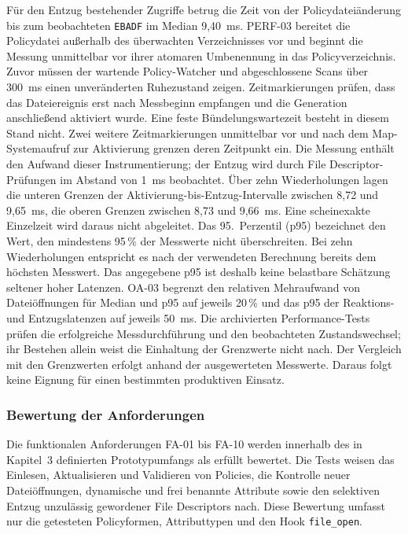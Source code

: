 Für den Entzug bestehender Zugriffe betrug die Zeit von der Policydateiänderung bis zum
beobachteten \texttt{EBADF} im Median 9,40~ms. PERF-03 bereitet die Policydatei außerhalb
des überwachten Verzeichnisses vor und beginnt die Messung unmittelbar vor ihrer atomaren
Umbenennung in das Policyverzeichnis. Zuvor müssen der wartende Policy-Watcher und abgeschlossene
Scans über 300~ms einen unveränderten Ruhezustand zeigen. Zeitmarkierungen prüfen, dass das
Dateiereignis erst nach Messbeginn empfangen und die Generation anschließend aktiviert wurde.
Eine feste Bündelungswartezeit besteht in diesem Stand nicht. Zwei weitere Zeitmarkierungen unmittelbar vor und nach dem Map-Systemaufruf
zur Aktivierung grenzen deren Zeitpunkt ein. Die Messung enthält den Aufwand dieser
Instrumentierung; der Entzug wird durch File Descriptor-Prüfungen im Abstand von 1~ms beobachtet.
Über zehn Wiederholungen lagen die unteren Grenzen der Aktivierung-bis-Entzug-Intervalle
zwischen 8,72 und 9,65~ms, die oberen Grenzen zwischen 8,73 und 9,66~ms. Eine scheinexakte
Einzelzeit wird daraus nicht abgeleitet. Das 95.~Perzentil (p95) bezeichnet
den Wert, den mindestens 95\,\% der Messwerte nicht überschreiten.
Bei zehn Wiederholungen entspricht es nach der verwendeten Berechnung
bereits dem höchsten Messwert. Das angegebene p95 ist deshalb keine
belastbare Schätzung seltener hoher Latenzen. OA-03 begrenzt den relativen Mehraufwand
von Dateiöffnungen für Median und p95 auf jeweils 20\,\% und das p95 der Reaktions- und
Entzugslatenzen auf jeweils 50~ms. Die archivierten Performance-Tests prüfen die erfolgreiche
Messdurchführung und den beobachteten Zustandswechsel; ihr Bestehen allein weist die
Einhaltung der Grenzwerte nicht nach. Der Vergleich mit den Grenzwerten erfolgt
anhand der ausgewerteten Messwerte. Daraus folgt keine Eignung für einen bestimmten
produktiven Einsatz.

\subsubsection{Bewertung der Anforderungen}

Die funktionalen Anforderungen FA-01 bis FA-10 werden innerhalb des in Kapitel~3 definierten
Prototypumfangs als erfüllt bewertet. Die Tests weisen das Einlesen, Aktualisieren und Validieren
von Policies, die Kontrolle neuer Dateiöffnungen, dynamische und frei benannte Attribute sowie
den selektiven Entzug unzulässig gewordener File Descriptors nach. Diese Bewertung umfasst nur
die getesteten Policyformen, Attributtypen und den Hook \texttt{file\_open}.
